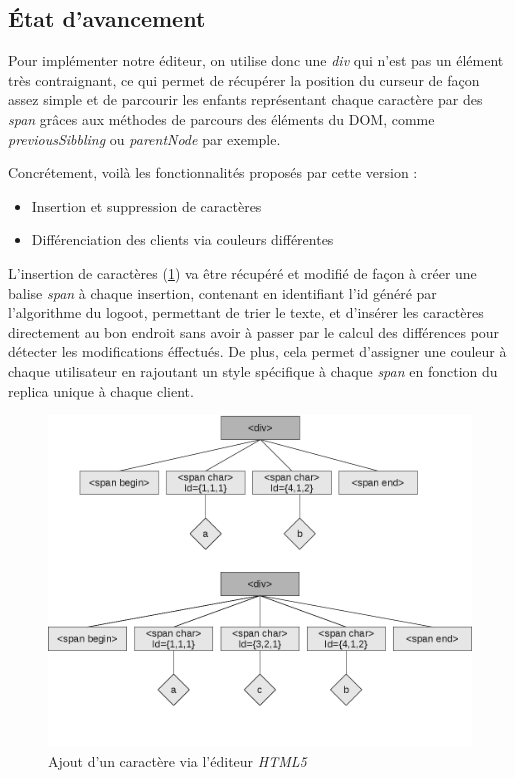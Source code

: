 	\subsection{État d'avancement}

	Pour implémenter notre éditeur, on utilise donc une \emph{div} qui n'est pas
	un élément très contraignant, ce qui permet de récupérer la position du
	curseur de façon assez simple et de parcourir les enfants représentant 
	chaque caractère par des \emph{span} grâces aux méthodes de parcours des 
	éléments du DOM, comme \emph{previousSibbling} ou \emph{parentNode} par 
	exemple.
	
	Concrétement, voilà les fonctionnalités proposés par cette version :
	\begin{itemize}
		\item Insertion et suppression de caractères
		\item Différenciation des clients via couleurs différentes 
	\end{itemize}
	
	L'insertion de caractères (\ref{fig:html5}) va être récupéré et modifié de façon à créer une 
	balise \emph{span} à chaque insertion, contenant en identifiant l'id généré 
	par l'algorithme du logoot, permettant de trier le texte, et d'insérer les 
	caractères directement au bon endroit sans avoir à passer par le calcul des 
	différences pour détecter les modifications éffectués.
	De plus, cela permet d'assigner une couleur à chaque utilisateur 
	en rajoutant un style spécifique à chaque \emph{span} en fonction du
	replica unique à chaque client.

	\begin{figure}[h]
		\label{fig:html5}
		\includegraphics[width=\textwidth]{includes/html5.png}
		\caption{Ajout d'un caractère via l'éditeur \emph{HTML5}}
	\end{figure}
	
